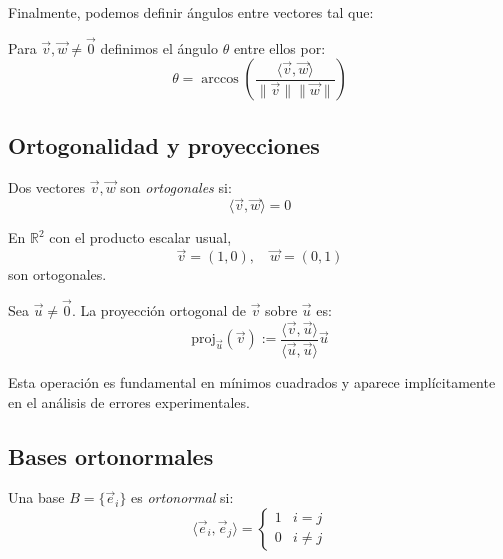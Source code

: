 \documentclass[10pt]{article}
\newcommand{\R}{\mathbb{R}}
\begin{document}
Finalmente, podemos definir ángulos entre vectores tal que:

\begin{definition}
  Para $\vec{v}, \vec{w} \neq \vec{0}$ definimos el ángulo $\theta$ entre ellos por:
  \[ \theta = \arccos(\frac{\langle \vec{v}, \vec{w} \rangle}{\|\vec{v}\|\|\vec{w}\|}) \]
\end{definition}

\subsection{Ortogonalidad y proyecciones}

\begin{definition}[Ortogonalidad]
  Dos vectores $\vec{v}, \vec{w}$ son \textit{ortogonales} si:
  \[ \langle \vec{v}, \vec{w} \rangle = 0 \]
\end{definition}

\begin{example}
  En $\R^2$ con el producto escalar usual,
  \[ \vec{v} = (1,0), \quad \vec{w} = (0,1) \]
  son ortogonales.
\end{example}

\begin{definition}
  Sea $\vec{u} \neq \vec{0}$. La proyección ortogonal de $\vec{v}$ sobre $\vec{u}$ es:
  \[ \mathrm{proj}_{\vec{u}}(\vec{v}) := \frac{\langle \vec{v}, \vec{u} \rangle}{\langle \vec{u}, \vec{u} \rangle} \vec{u} \]
\end{definition}

\begin{remark}
  Esta operación es fundamental en mínimos cuadrados y aparece implícitamente
  en el análisis de errores experimentales.
\end{remark}

\subsection{Bases ortonormales}

\begin{definition}
  Una base $B = \{\vec{e}_i\}$ es \textit{ortonormal} si:
  \[
    \langle \vec{e}_i, \vec{e}_j \rangle =
    \begin{cases}
      1 & i = j \\
      0 & i \neq j
    \end{cases}
  \]
\end{definition}
\end{document}
